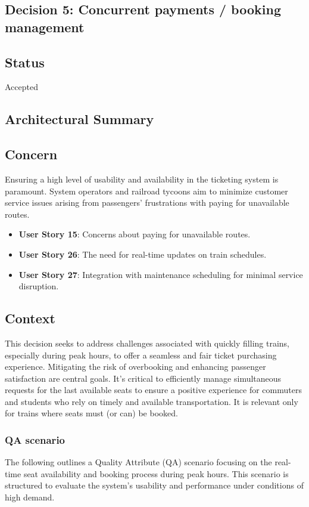 \subsection{Decision 5: Concurrent payments / booking management}

\subsection*{Status}
Accepted

\subsection*{Architectural Summary}

\subsection*{Concern}
Ensuring a high level of usability and availability in the ticketing system is paramount. System operators and railroad tycoons aim to minimize customer service issues arising from passengers' frustrations with paying for unavailable routes.
\begin{itemize}
    \item \textbf{User Story 15}: Concerns about paying for unavailable routes.
    \item \textbf{User Story 26}: The need for real-time updates on train schedules.
    \item \textbf{User Story 27}: Integration with maintenance scheduling for minimal service disruption.
\end{itemize}

\subsection*{Context}
This decision seeks to address challenges associated with quickly filling trains, especially during peak hours, to offer a seamless and fair ticket purchasing experience. Mitigating the risk of overbooking and enhancing passenger satisfaction are central goals. It's critical to efficiently manage simultaneous requests for the last available seats to ensure a positive experience for commuters and students who rely on timely and available transportation.
It is relevant only for trains where seats must (or can) be booked.

\subsubsection*{QA scenario}
The following outlines a Quality Attribute (QA) scenario focusing on the real-time seat availability and booking process during peak hours. This scenario is structured to evaluate the system's usability and performance under conditions of high demand.
